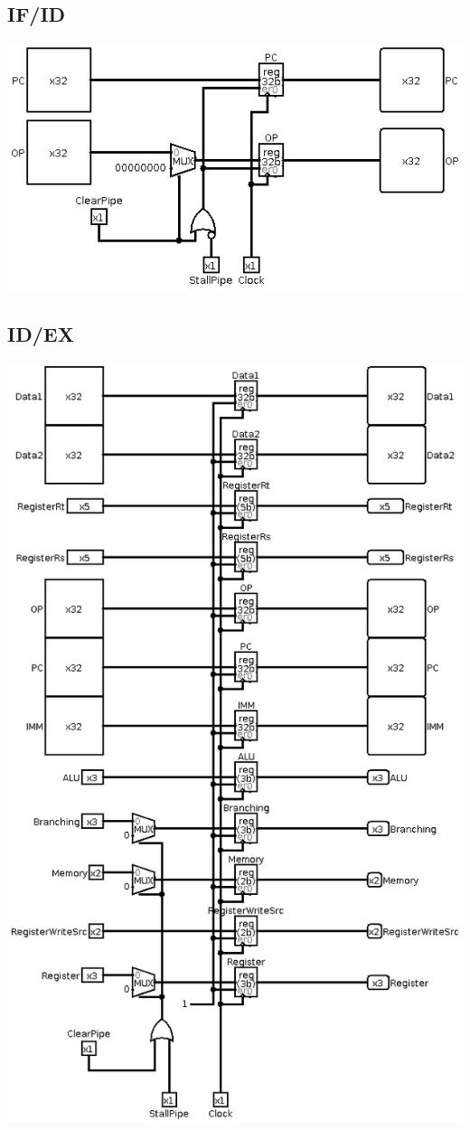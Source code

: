 \subsection{IF/ID}
\includegraphics[width=\textwidth]{billeder/IF/ID.png}

\subsection{ID/EX}
\begin{center}\includegraphics[width=.9\textwidth]{billeder/ID/EX.png}\end{center}

